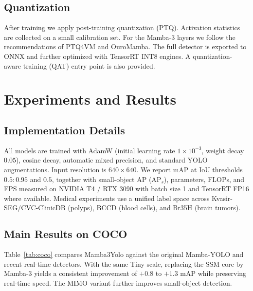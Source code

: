 \documentclass[10pt,twocolumn,letterpaper]{article}
\begin{document}
\subsection{Quantization}
After training we apply post-training quantization (PTQ). Activation statistics are collected on a small calibration set. For the Mamba-3 layers we follow the recommendations of PTQ4VM and OuroMamba. The full detector is exported to ONNX and further optimized with TensorRT INT8 engines. A quantization-aware training (QAT) entry point is also provided.

\section{Experiments and Results}
\label{sec:experiments}

\subsection{Implementation Details}
All models are trained with AdamW (initial learning rate \(1\times10^{-3}\), weight decay \(0.05\)), cosine decay, automatic mixed precision, and standard YOLO augmentations. Input resolution is \(640\times640\). We report mAP at IoU thresholds \(0.5:0.95\) and \(0.5\), together with small-object AP (AP\(_s\)), parameters, FLOPs, and FPS measured on NVIDIA T4 / RTX 3090 with batch size 1 and TensorRT FP16 where available. Medical experiments use a unified label space across Kvasir-SEG/CVC-ClinicDB (polyps), BCCD (blood cells), and Br35H (brain tumors).

\subsection{Main Results on COCO}
Table~\ref{tab:coco} compares Mamba3Yolo against the original Mamba-YOLO and recent real-time detectors. With the same Tiny scale, replacing the SSM core by Mamba-3 yields a consistent improvement of \(+0.8\) to \(+1.3\) mAP while preserving real-time speed. The MIMO variant further improves small-object detection.
\end{document}
